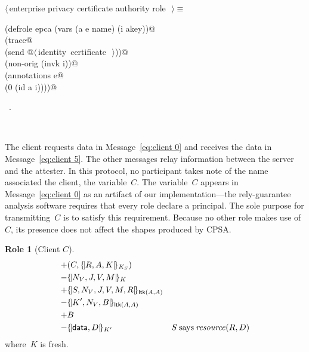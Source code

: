 \documentclass[titlepage,12pt]{article}
\theoremstyle{definition}
\newtheorem{role}{Role}
\newcommand{\inbnd}{\mathord -}
\newcommand{\outbnd}{\mathord +}
\newcommand{\says}{\mathbin{\mathrm{says}}}
\DeclareMathOperator{\resource}{\mathit{resource}}
\begin{document}
\begin{flushleft} \small
\begin{minipage}{\linewidth} \label{scrap14}
$\langle\,$enterprise privacy certificate authority role\nobreak\ {\footnotesize {}}$\,\rangle\equiv$
\vspace{-1ex}
\begin{list}{}{} \item
\mbox{}\verb@(defrole epca (vars (a e name) (i akey))@\\
\mbox{}\verb@  (trace@\\
\mbox{}\verb@    (send @\hbox{$\langle\,$identity certificate\nobreak\ {\footnotesize {}}$\,\rangle$}\verb@))@\\
\mbox{}\verb@  (non-orig (invk i))@\\
\mbox{}\verb@  (annotations e@\\
\mbox{}\verb@    (0 (id a i))))@{\NWsep}
\end{list}
\vspace{-1ex}
\footnotesize\addtolength{\baselineskip}{-1ex}
\begin{list}{}{\setlength{\itemsep}{-\parsep}\setlength{\itemindent}{-\leftmargin}}
\item \NWtxtMacroRefIn\ .
\end{list}
\end{minipage}\\[4ex]
\end{flushleft}
The client requests data in Message~\ref{eq:client 0} and receives the
data in Message~\ref{eq:client 5}.  The other messages relay information
between the server and the attester.  In this protocol, no participant
takes note of the name associated the client, the variable~$C$.  The
variable~$C$ appears in Message~\ref{eq:client 0} as an artifact of our
implementation---the rely-guarantee analysis software requires that
every role declare a principal.  The sole purpose for transmitting~$C$
is to satisfy this requirement.  Because no other role makes use
of~$C$, its presence does not affect the shapes produced by CPSA.

\begin{role}[Client $C$]
\begin{eqnarray}
&\outbnd(C,\ctosa)\label{eq:client 0}\\
&\inbnd\stoca\\
&\outbnd\ctoaa\\
&\inbnd\atoca\\
&\outbnd B\\
&\inbnd\stocb&S\says\resource(R,D)\label{eq:client 5}
\end{eqnarray}
where~$K$ is fresh.
\end{role}
\end{document}
